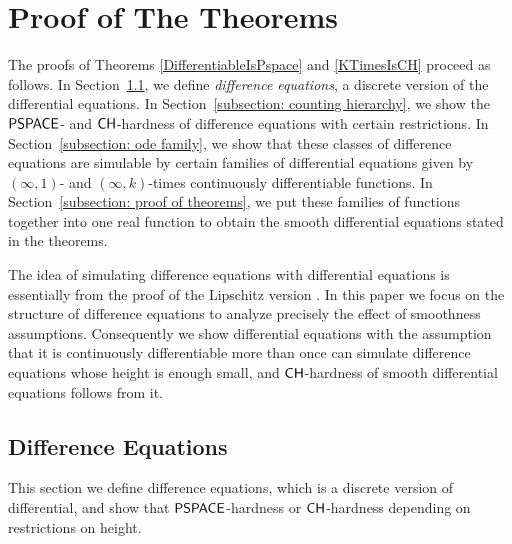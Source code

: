 \section{Proof of The Theorems}
\label{section:differentiable}

The proofs of Theorems \ref{DifferentiableIsPspace} and \ref{KTimesIsCH}
proceed as follows. 
In Section~\ref{section:divp}, 
we define \emph{difference equations}, 
a discrete version of the differential equations. 
In Section~\ref{subsection: counting hierarchy}, 
we show the $\mathsf{PSPACE}$- and $\mathsf{CH}$-hardness of 
difference equations with certain restrictions. 
In Section~\ref{subsection: ode family}, 
we show that these classes of difference equations are simulable 
by certain families of differential equations
given by $(\infty, 1)$- and $(\infty, k)$-times continuously differentiable functions. 
In Section~\ref{subsection: proof of theorems}, 
we put these families of functions together into one real function
to obtain the smooth differential equations stated in the theorems. 

The idea of simulating difference equations with differential equations
is essentially from the proof of 
the Lipschitz version \cite{kawamura2010lipschitz}.
In this paper we focus on the structure of difference equations
to analyze precisely the effect of smoothness assumptions.
Consequently we show differential equations with the assumption that it is continuously differentiable more than once
can simulate difference equations whose height is enough small,
and $\mathsf{CH}$-hardness of smooth differential equations follows from it.

\subsection{Difference Equations}
\label{section:divp}

This section we define difference equations, which is a discrete version of differential,
and show that $\mathsf{PSPACE}$-hardness or $\mathsf{CH}$-hardness depending on restrictions on height.

